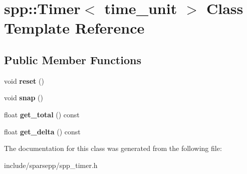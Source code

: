 \hypertarget{classspp_1_1_timer}{}\section{spp\+:\+:Timer$<$ time\+\_\+unit $>$ Class Template Reference}
\label{classspp_1_1_timer}
\subsection*{Public Member Functions}
\begin{DoxyCompactItemize}
\item 
void {\bfseries reset} ()\hypertarget{classspp_1_1_timer_a3f15251c676004b2604fae48a3929dae}{}\label{classspp_1_1_timer_a3f15251c676004b2604fae48a3929dae}

\item 
void {\bfseries snap} ()\hypertarget{classspp_1_1_timer_a166f1fe22fd284d16d95198da0b94b30}{}\label{classspp_1_1_timer_a166f1fe22fd284d16d95198da0b94b30}

\item 
float {\bfseries get\+\_\+total} () const \hypertarget{classspp_1_1_timer_a8ccd5706f2c72ec6637a9af2a910b02a}{}\label{classspp_1_1_timer_a8ccd5706f2c72ec6637a9af2a910b02a}

\item 
float {\bfseries get\+\_\+delta} () const \hypertarget{classspp_1_1_timer_abc47216939a426c81617ced870a09da6}{}\label{classspp_1_1_timer_abc47216939a426c81617ced870a09da6}

\end{DoxyCompactItemize}


The documentation for this class was generated from the following file\+:\begin{DoxyCompactItemize}
\item 
include/sparsepp/spp\+\_\+timer.\+h\end{DoxyCompactItemize}
